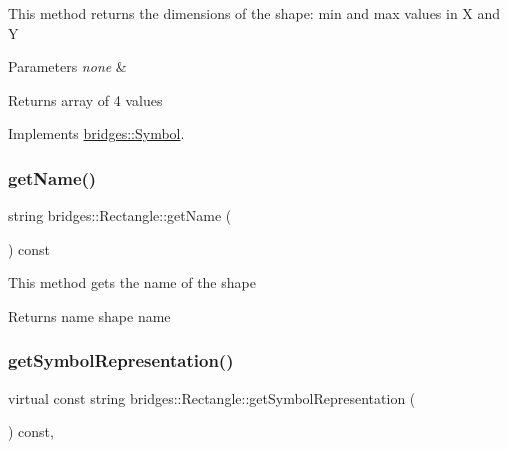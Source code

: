 This method returns the dimensions of the shape\+: min and max values in X and Y


\begin{DoxyParams}{Parameters}
{\em none} & \\
\hline
\end{DoxyParams}
\begin{DoxyReturn}{Returns}
array of 4 values 
\end{DoxyReturn}


Implements \mbox{\hyperlink{classbridges_1_1_symbol_a6eb190dc71b31b344b7610a07c6dc1d5}{bridges\+::\+Symbol}}.

\mbox{\label{classbridges_1_1_rectangle_a78d234b0cb0e7263f2380b3a5f454178}} 
\subsubsection{\texorpdfstring{getName()}{getName()}}
{\footnotesize\ttfamily string bridges\+::\+Rectangle\+::get\+Name (\begin{DoxyParamCaption}{ }\end{DoxyParamCaption}) const\hspace{0.3cm}{\ttfamily [inline]}}

This method gets the name of the shape

\begin{DoxyReturn}{Returns}
name shape name 
\end{DoxyReturn}
\mbox{\label{classbridges_1_1_rectangle_a509c9489c6f145b684447851736acac5}} 
\subsubsection{\texorpdfstring{getSymbolRepresentation()}{getSymbolRepresentation()}}
{\footnotesize\ttfamily virtual const string bridges\+::\+Rectangle\+::get\+Symbol\+Representation (\begin{DoxyParamCaption}{ }\end{DoxyParamCaption}) const\hspace{0.3cm}{\ttfamily [inline]}, {\ttfamily [virtual]}}

